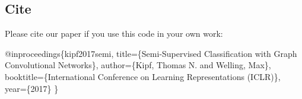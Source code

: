 \subsection*{Cite}

Please cite our paper if you use this code in your own work\+:


\begin{DoxyCode}
@inproceedings\{kipf2017semi,
  title=\{Semi-Supervised Classification with Graph Convolutional Networks\},
  author=\{Kipf, Thomas N. and Welling, Max\},
  booktitle=\{International Conference on Learning Representations (ICLR)\},
  year=\{2017\}
\}
\end{DoxyCode}
 
